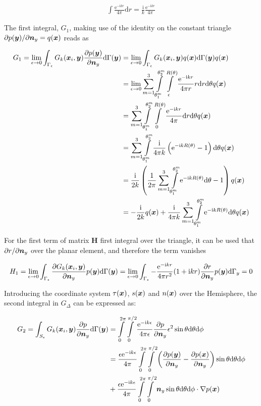 \documentclass[a4paper, 10pt]{article}
\newcommand{\te}{\mathrm{e}}
\newcommand{\ti}{\mathrm{i}}
\newcommand{\td}{\mathrm{d}}
\newcommand{\sx}{\bm{\mathnormal{x}}}
\newcommand{\sy}{\bm{\mathnormal{y}}}
\newcommand{\sn}{\bm{\mathnormal{n}}}
\newcommand{\bH}{\mathbf{H}}
\newcommand{\limeps}{\lim\limits_{\epsilon \rightarrow 0}}
\newcommand{\intsph}{\int\limits_{0}^{2\pi} \int\limits_{0}^{\pi/2}}
\newcommand{\drph}{\mathrm{d} r \mathrm{d}\theta}
\newcommand{\summ}{\sum\limits_{m=1}^3}
\newcommand{\intme}{\int\limits_{\theta_1^m}^{\theta_2^m}\int\limits_\epsilon^{R(\theta)}}
\newcommand{\intmn}{\int\limits_{\theta_1^m}^{\theta_2^m}\int\limits_0^{R(\theta)}}
\newcommand{\intms}{\int\limits_{\theta_1^m}^{\theta_2^m}}
\begin{document}
\begin{align}
	\int \frac{\te ^{-\ti kr}}{4 \pi} \mathrm{d} r = \frac{\ti}{ k} \frac{\te ^{-\ti kr}}{4 \pi}
\end{align}

The first integral, $G_1$, making use of the identity on the constant triangle $\partial p(\sy) / \partial \sn_y = q(\sx)$ reads as

\begin{align}
	G_1 = \limeps \int_{\Gamma_\epsilon} G_k(\sx_i,\sy) \frac{\partial p(\sy)}{\partial \sn_y} \td \Gamma(\sy) 
	& = \limeps \int_{\Gamma_\epsilon} G_k(\sx_i,\sy) q(\sx) \td \Gamma(\sy) q(\sx) \nonumber \\
	& = \limeps \summ \intme \frac{\te ^{- \ti k r}}{4 \pi r} r \drph q(\sx) \nonumber \\
	& = \summ \intmn \frac{\te^{-\ti kr}}{4 \pi} \drph q(\sx) \nonumber \\
	& = \summ \intms \frac{\ti}{4\pi k}\left(\te^{-\ti k R(\theta)} -1\right) \mathrm{d} \theta q(\sx) \nonumber \\
	& = \frac{\ti}{2k}\left(\frac{1}{2\pi}\summ \intms \te ^{-\ti kR(\theta)} \mathrm{d} \theta -1 \right) q(\sx) \nonumber \\
    & = -\frac{\ti}{2k} q(\sx) + \frac{\ti}{4\pi k}\summ \intms \te ^{-\ti kR(\theta)} \mathrm{d} \theta q(\sx)
\end{align}

For the first term of matrix $\bH$ first integral over the triangle, it can be used that $\partial r / \partial \sn_y$ over the planar element, and therefore the term vanishes

\begin{align}
	H_1 = \limeps \int_{\Gamma_\epsilon}\frac{\partial{G}_k (\sx_i, \sy)}{\partial \sn_y} p(\sy) \td \Gamma(\sy) =
	\limeps \int_{\Gamma_\epsilon}-\frac{\te ^{-\ti k r}}{4 \pi r^2}(1 + \ti kr) \frac{\partial r}{\partial \sn_y} p(\sy) \mathrm{d} \Gamma_y = 0
\end{align}

Introducing the coordinate system $\tau(\sx)$, $s(\sx)$ and $n(\sx)$ over the Hemisphere, the second integral in $G_\Delta$ can be expressed as:

\begin{align}
	G_2 = \int_{S_\epsilon} G_k(\sx_i, \sy) \frac{\partial p}{\partial \sn_y} \td \Gamma(\sy) & = \intsph \frac{\te^{-\ti k \epsilon}}{4 \pi \epsilon} \frac{\partial p}{\partial \sn_y} \epsilon^2 \sin \theta \mathrm{d} \theta \mathrm{d} \phi \nonumber \\
	& = \frac{\epsilon \te ^{-\ti k \epsilon}}{4 \pi} \intsph \left(\frac{\partial p(\sy)}{\partial \sn_y} -\frac{\partial p(\sx)}{\partial \sn_y} \right) \sin \theta \mathrm{d} \theta \mathrm{d} \phi \nonumber \\
	& + \frac{\epsilon \te ^{-\ti k \epsilon}}{4 \pi} \intsph \sn_y \sin \theta \mathrm{d} \theta \mathrm{d} \phi \cdot \nabla p(\sx)
\end{align}
\end{document}
